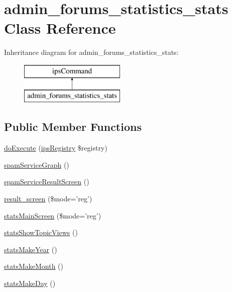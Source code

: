 \hypertarget{classadmin__forums__statistics__stats}{\section{admin\-\_\-forums\-\_\-statistics\-\_\-stats Class Reference}
\label{classadmin__forums__statistics__stats}
}
Inheritance diagram for admin\-\_\-forums\-\_\-statistics\-\_\-stats\-:\begin{figure}[H]
\begin{center}
\leavevmode
\includegraphics[height=2.000000cm]{classadmin__forums__statistics__stats}
\end{center}
\end{figure}
\subsection*{Public Member Functions}
\begin{DoxyCompactItemize}
\item 
\hyperlink{classadmin__forums__statistics__stats_afbc4e912a0604b94d47d66744c64d8ba}{do\-Execute} (\hyperlink{classips_registry}{ips\-Registry} \$registry)
\item 
\hyperlink{classadmin__forums__statistics__stats_a4341b9bc676865f29b0e2e0cc967e3dd}{spam\-Service\-Graph} ()
\item 
\hyperlink{classadmin__forums__statistics__stats_aae3bdfa58aa22ac274bda49be5e5d467}{spam\-Service\-Result\-Screen} ()
\item 
\hyperlink{classadmin__forums__statistics__stats_aea30383e23871ca1ee3844b336df8963}{result\-\_\-screen} (\$mode='reg')
\item 
\hyperlink{classadmin__forums__statistics__stats_ab0d61894ae2b4139ccbec4ea652abca2}{stats\-Main\-Screen} (\$mode='reg')
\item 
\hyperlink{classadmin__forums__statistics__stats_a320a4bbb7a715924def7ab8bea3f1734}{stats\-Show\-Topic\-Views} ()
\item 
\hyperlink{classadmin__forums__statistics__stats_accc3fc023ec7e71f4433e9111bb96720}{stats\-Make\-Year} ()
\item 
\hyperlink{classadmin__forums__statistics__stats_a1d6a0b25a080d25b8f3b43ab25a61084}{stats\-Make\-Month} ()
\item 
\hyperlink{classadmin__forums__statistics__stats_a008f79e24bea6e8f973ccc571c0ad0a3}{stats\-Make\-Day} ()
\end{DoxyCompactItemize}
